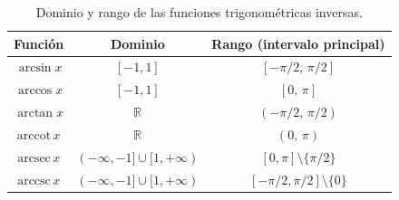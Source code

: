 \begin{definition}
\begin{table}[H]
\centering
\renewcommand{\arraystretch}{1.6}
\begin{tabular}{|c|c|c|}
\hline
\textbf{Función} & \textbf{Dominio} & \textbf{Rango (intervalo principal)} \\
\hline
$\arcsin x$ & $[-1,1]$ & $[-\pi/2,\,\pi/2]$ \\
$\arccos x$ & $[-1,1]$ & $[0,\,\pi]$ \\
$\arctan x$ & $\mathbb{R}$ & $(-\pi/2,\,\pi/2)$ \\
$\text{arccot}\, x$ & $\mathbb{R}$ & $(0,\,\pi)$ \\
$\text{arcsec}\, x$ & $(-\infty,-1]\cup[1,+\infty)$ & $[0,\pi]\setminus\{\pi/2\}$ \\
$\text{arccsc}\, x$ & $(-\infty,-1]\cup[1,+\infty)$ & $[-\pi/2,\pi/2]\setminus\{0\}$ \\
\hline
\end{tabular}
\caption{Dominio y rango de las funciones trigonométricas inversas.}
\end{table}
\end{definition}

